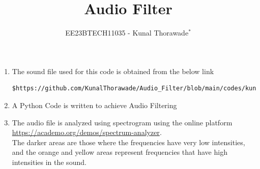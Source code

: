 \documentclass[journal,12pt,twocolumn]{IEEEtran}
\theoremstyle{remark}
\begin{document}

\vspace{3cm}
\title{Audio Filter}
\author{EE23BTECH11035 - Kunal Thorawade$^{*}$%
}
\maketitle
\newpage
\bigskip
\renewcommand{\thefigure}{\arabic{figure}}
\renewcommand{\thetable}{\theenumi}


\begin{enumerate}[label=\thesection.\arabic*
,ref=\thesection.\theenumi]
\section{Digital Filter}
\label{input_sound}
\item The sound file used for this code is obtained from the below link
\begin{lstlisting}
$https://github.com/KunalThorawade/Audio_Filter/blob/main/codes/kunal.wav
\end{lstlisting}
\item 
\label{Python code}
A Python Code is written to achieve Audio Filtering 
\label{prob:audio_filter_problem}

\item 
\label{Visualization}

The audio file is analyzed using spectrogram using the online platform \href{https://academo.org/demos/spectrum-analyzer}{\url{https://academo.org/demos/spectrum-analyzer}}.\\

The darker areas are those where the frequencies have very low intensities, and the orange and yellow areas represent frequencies that have high intensities in the sound.



\end{enumerate}
\end{document}
